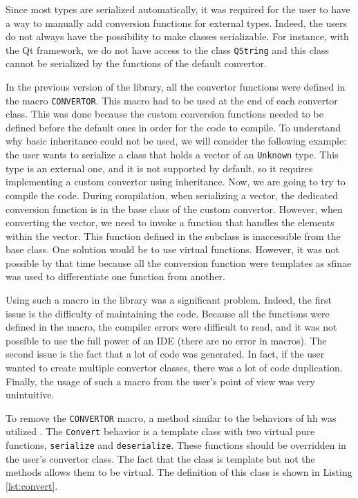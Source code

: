 Since most types are serialized automatically, it was required for the user to
have a way to manually add conversion functions for external types. Indeed, the
users do not always have the possibility to make classes serializable. For
instance, with the Qt framework, we do not have access to the class
\texttt{QString} and this class cannot be serialized by the functions of the
default convertor.

In the previous version of the library, all the convertor functions were defined
in the macro \texttt{CONVERTOR}. This macro had to be used at the end of each
convertor class. This was done because the custom conversion functions needed to
be defined before the default ones in order for the code to compile. To
understand why basic inheritance could not be used, we will consider the
following example: the user wants to serialize a class that holds a vector of an
\texttt{Unknown} type. This type is an external one, and it is not supported by
default, so it requires implementing a custom convertor using inheritance. Now,
we are going to try to compile the code. During compilation, when serializing a
vector, the dedicated conversion function is in the base class of the custom
convertor. However, when converting the vector, we need to invoke a function
that handles the elements within the vector. This function defined in the
subclass is inaccessible from the base class. One solution would be to use
virtual functions. However, it was not possible by that time because all the
conversion function were templates as \gls{sfinae} was used to differentiate
one function from another.

Using such a macro in the library was a significant problem. Indeed, the first
issue is the difficulty of maintaining the code. Because all the functions were
defined in the macro, the compiler errors were difficult to read, and it was not
possible to use the full power of an IDE (there are no error in macros). The
second issue is the fact that a lot of code was generated. In fact, if the user
wanted to create multiple convertor classes, there was a lot of code
duplication. Finally, the usage of such a macro from the user's point of view
was very unintuitive.

To remove the \texttt{CONVERTOR} macro, a method similar to the behaviors of
\gls{hh} was utilized \cite{bardakoff2021analysis}. The \texttt{Convert}
behavior is a template class with two virtual pure functions, \texttt{serialize}
and \texttt{deserialize}. These functions should be overridden in the user's
convertor class. The fact that the class is template but not the methods allows
them to be virtual. The definition of this class is shown in Listing
\ref{lst:convert}.


